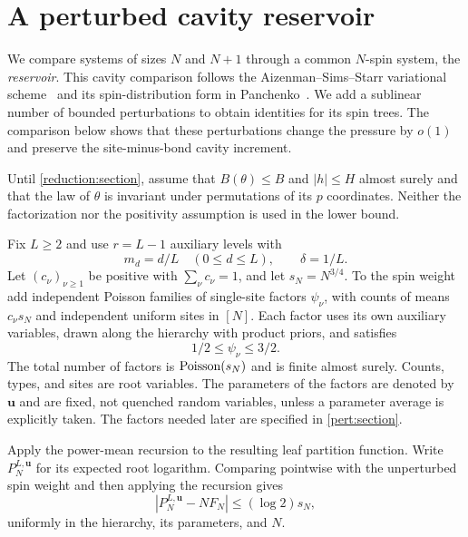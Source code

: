 \section{A perturbed cavity reservoir}\label{cavity:section}

We compare systems of sizes $N$ and $N+1$ through a common $N$-spin
system, the \emph{reservoir}. This cavity comparison follows the
Aizenman--Sims--Starr variational scheme~\cite{ASS03} and its
spin-distribution form in Panchenko~\cite[Section~2.2]{Pan13}. We add a sublinear number of bounded perturbations
to obtain identities for its spin trees. The comparison below shows
that these perturbations change the pressure by $o(1)$ and preserve
the site-minus-bond cavity increment.

Until \cref{reduction:section}, assume that $B(\theta)\le B$ and
$|h|\le H$ almost surely and that the law of $\theta$ is invariant under
permutations of its $p$ coordinates. Neither the factorization nor the
positivity assumption is used in the lower bound.

Fix $L\ge2$ and use $r=L-1$ auxiliary levels with
\begin{equation}\label{cavity:grid}
 m_d=d/L\quad(0\le d\le L),\qquad\delta=1/L.
\end{equation}
Let $(c_\nu)_{\nu\ge1}$ be positive with $\sum_\nu c_\nu=1$, and let
$s_N=N^{3/4}$. To the spin weight add independent Poisson families of
single-site factors $\psi_\nu$, with counts of means $c_\nu s_N$ and
independent uniform sites in $[N]$. Each factor uses its own auxiliary
variables, drawn along the hierarchy with product priors, and satisfies
\begin{equation}\label{cavity:factor-bounds}
 1/2\le\psi_\nu\le3/2.
\end{equation}
The total number of factors is $\operatorname{Poisson}(s_N)$ and is finite almost surely.
Counts, types, and sites are root variables. The parameters of the factors
are denoted by $\mathbf u$ and are fixed, not quenched random variables,
unless a parameter average is explicitly taken. The factors needed later
are specified in \cref{pert:section}.

Apply the power-mean recursion to the resulting leaf partition function.
Write $P_N^{L,\mathbf u}$ for its expected root logarithm. Comparing
pointwise with the unperturbed spin weight and then applying the recursion
gives
\begin{equation}\label{cavity:negligible}
 |P_N^{L,\mathbf u}-NF_N|\le (\log2)s_N,
\end{equation}
uniformly in the hierarchy, its parameters, and $N$.

